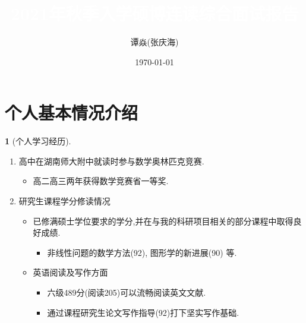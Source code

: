 \documentclass[UTF8]{ctexbeamer}	%
\title{\textcolor{white}{2021年秋季入学硕博连读综合面试报告}}
\author{谭焱(张庆海)}
\institute{浙江大学数学科学学院}
\date{\today}
\theoremstyle{plain}
\theoremstyle{definition}
\newtheorem{emt}{}[section]
\theoremstyle{remark}
\numberwithin{equation}{section}
\begin{document}

\begin{frame}
\titlepage
\end{frame}



\section{个人基本情况介绍}


        


\begin{frame}[fragile]
    \begin{emt}[个人学习经历]
\begin{enumerate}
    \item 高中在湖南师大附中就读时参与数学奥林匹克竞赛.
    \begin{itemize}
        \item 高二高三两年获得数学竞赛省一等奖.
    \end{itemize}
    \item 研究生课程学分修读情况
    \begin{itemize}
        \item 已修满硕士学位要求的学分,并在与我的科研项目相关的部分课程中取得良好成绩.
        \begin{itemize}
            \item 非线性问题的数学方法(92), 图形学的新进展(90) 等.
        \end{itemize}
        \item 英语阅读及写作方面
        \begin{itemize}
            \item 六级489分(阅读205)可以流畅阅读英文文献.
            \item 通过课程研究生论文写作指导(92)打下坚实写作基础.
        \end{itemize}
    \end{itemize}
\end{enumerate}
\end{emt}
\end{frame}
\end{document}
